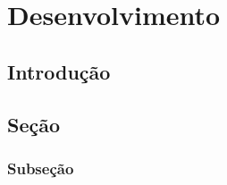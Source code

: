 \chapter{Desenvolvimento}

\section{Introdução}

\lipsum[1-4]

\section{Seção}

\lipsum[2-4]

\subsection{Subseção}

\lipsum[2-4]